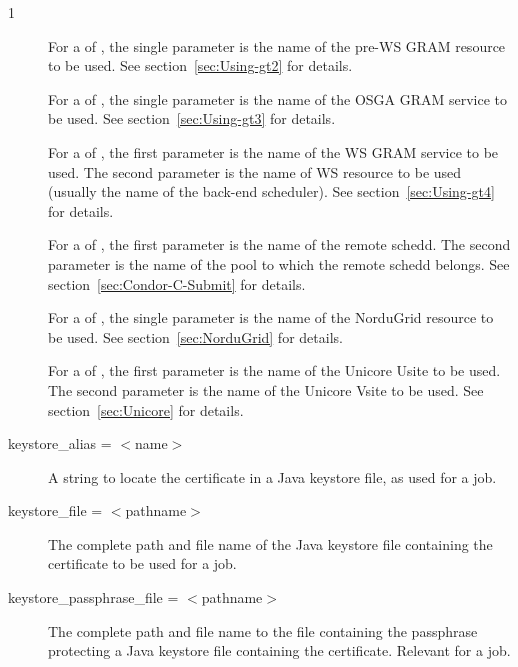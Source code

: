 \begin{ManPage}{\label{man-condor-submit}}{1}
\begin{description}
For a  of ,
the single parameter is the name of the pre-WS GRAM resource to be used.
See section~\ref{sec:Using-gt2} for details.

For a  of ,
the single parameter is the name of the OSGA GRAM service to be used.
See section~\ref{sec:Using-gt3} for details.

For a  of ,
the first parameter is the name of the WS GRAM service to be used.
The second parameter is the name of WS resource to be used (usually the
name of the back-end scheduler).
See section~\ref{sec:Using-gt4} for details.

For a  of ,
the first parameter is the name of the remote schedd.
The second parameter is the name of the pool to which the remote
schedd belongs.
See section~\ref{sec:Condor-C-Submit} for details.

For a  of ,
the single parameter is the name of the NorduGrid resource to be used.
See section~\ref{sec:NorduGrid} for details.

For a  of ,
the first parameter is the name of the Unicore Usite to be used.
The second parameter is the name of the Unicore Vsite to be used.
See section~\ref{sec:Unicore} for details.


\item[keystore\_alias = $<$name$>$]
A string to locate the certificate in a Java keystore file,
as used for a  job.


\item[keystore\_file = $<$pathname$>$]
The complete path and file name of the Java keystore file
containing the certificate to be used for a  job.

\item[keystore\_passphrase\_file = $<$pathname$>$]
The complete path and file name
to the file containing the passphrase protecting a Java keystore
file containing the certificate.
Relevant for a  job.


\end{description}
\end{ManPage}
